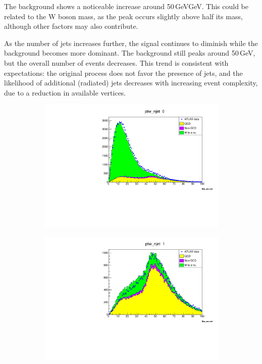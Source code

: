     The background shows a noticeable increase around 50\,GeVGeV. This could be related to the W boson mass, as the peak occurs slightly above half its mass,
    although other factors may also contribute.

    As the number of jets increases further, the signal continues to diminish while the background becomes more dominant.
    The background still peaks around 50\,GeV, but the overall number of events decreases.
    This trend is consistent with expectations: the original process does not favor the presence of jets,
    and the likelihood of additional (radiated) jets decreases with increasing event complexity, due to a reduction in available vertices.
    \begin{figure}
        \begin{subfigure}{0.5\textwidth}
            \includegraphics[width=\textwidth]{../W_mass/ptw_njet0.pdf}
        \end{subfigure}
        \begin{subfigure}{0.5\textwidth}
            \includegraphics[width=\textwidth]{../W_mass/ptw_njet1.pdf}

\end{subfigure}
\end{figure}
